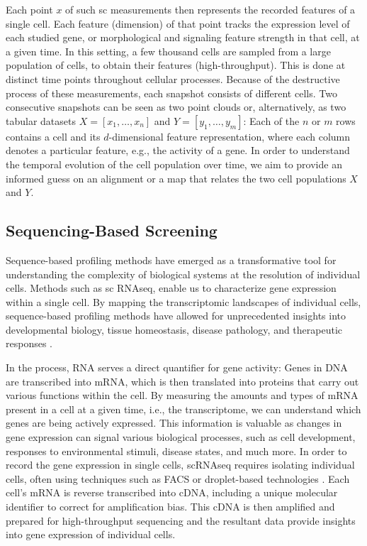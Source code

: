 Each point $x$ of such \acrlong{sc} measurements then represents the recorded features of a single cell. Each feature (dimension) of that point tracks the expression level of each studied gene, or morphological and signaling feature strength in that cell, at a given time. In this setting, a few thousand cells are sampled from a large population of cells, to obtain their features (high-throughput). This is done at distinct time points throughout cellular processes. Because of the destructive process of these measurements, each snapshot consists of different cells.
Two consecutive snapshots can be seen as two point clouds %
or, alternatively, as two tabular datasets $X = [x_1,\dots, x_n]$ and $Y=[y_1, \dots, y_m]$: Each of the $n$ or $m$ rows contains a cell and its $d$-dimensional feature representation, where each column denotes a particular feature, e.g., the activity of a gene.
In order to understand the temporal evolution of the cell population over time, we aim to provide an informed guess on an alignment or a map that relates the two cell populations $X$ and $Y$.

\subsection{Sequencing-Based Screening}
\label{sec:background_sequencing}

Sequence-based profiling methods have emerged as a transformative tool for understanding the complexity of biological systems at the resolution of individual cells. Methods such as \acrlong{sc} \acrshort{RNAseq}, enable us to characterize gene expression within a single cell.
By mapping the transcriptomic landscapes of individual cells, sequence-based profiling methods have allowed for unprecedented insights into developmental biology, tissue homeostasis, disease pathology, and therapeutic responses \citep{van2023applications}.

In the process, RNA serves a direct quantifier for gene activity: Genes in \acrfull{DNA} are transcribed into \acrfull{mRNA}, which is then translated into proteins that carry out various functions within the cell.
By measuring the amounts and types of \acrshort{mRNA} present in a cell at a given time, i.e., the transcriptome, we can understand which genes are being actively expressed. This information is valuable as changes in gene expression can signal various biological processes, such as cell development, responses to environmental stimuli, disease states, and much more. 
In order to record the gene expression in single cells, \acrshort{sc}\acrshort{RNAseq} requires isolating individual cells, often using techniques such as \acrfull{FACS} \citep{julius1972demonstration} or droplet-based technologies \citep{brouzes2009droplet, mazutis2013single, debs2012functional}. Each cell's \acrshort{mRNA} is reverse transcribed into \acrfull{cDNA}, including a unique molecular identifier to correct for amplification bias.
This \acrshort{cDNA} is then amplified and prepared for high-throughput sequencing and the resultant data provide insights into gene expression of individual cells.

